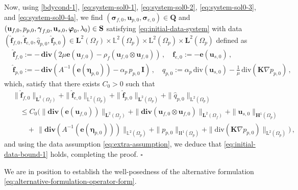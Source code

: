 \documentclass[11pt]{article}
\numberwithin{equation}{section}
\newcommand{\bgamma}{{\boldsymbol\gamma}}
\newcommand{\bbeta}{{\boldsymbol\eta}}
\newcommand{\bsi}{{\boldsymbol\sigma}}
\newcommand{\bvarphi}{{\boldsymbol\varphi}}
\newcommand{\f}{\mathbf{f}}
\newcommand{\bu}{\mathbf{u}}
\newcommand{\be}{{\mathbf{e}}}
\newcommand{\0}{{\mathbf{0}}}
\def\bK{\mathbf{K}}
\def\bI{\mathbf{I}}
\def\bQ{\mathbf{Q}}
\def\bS{\mathbf{S}}
\newcommand{\bL}{\mathbf{L}}
\newcommand\bH{\mathbf{H}}
\newcommand\bbL{\mathbb{L}}
\def\H{\mathrm{H}}
\def\L{\mathrm{L}}
\def\bdiv{\mathbf{div}}
\def\div{\mathrm{div}}
\def\wh{\widehat}
\newenvironment{proof}{\noindent{\it Proof.}}{\hfill$\square$}
\numberwithin{equation}{section}
\begin{document}
\begin{proof}
Now, using \eqref{bdycond-1}, \eqref{eq:system-sol0-1}, \eqref{eq:system-sol0-2}, \eqref{eq:system-sol0-3}, and \eqref{eq:system-sol0-4a}, we find
$(\bsi_{f,0}, \bu_{p,0}, \bsi_{e,0})\in \bQ$ and  $(\bu_{f,0},p_{p,0},\bgamma_{f,0},\newline\bu_{s,0},\bvarphi_0,\lambda_0)\in \bS$ satisfying \eqref{eq:initial-data-system} with data $(\wh{\f}_{f,0},\wh{\f}_{e,0},\wh{q}_{p,0},\wh{\f}_{p,0})\in 
\bL^2(\Omega_f)\times\bbL^2(\Omega_p)\times \L^2(\Omega_p) \times \bL^2(\Omega_p)$ defined as
%
\begin{align*}
& \wh{\f}_{f,0} := -\,\bdiv(2\mu\be(\bu_{f,0}) - \rho_f(\bu_{f,0}\otimes\bu_{f,0})) \,,\quad 
{\f}_{e,0} := -\be(\bu_{s,0}) \,,\\[0.5ex]
& \wh{\f}_{p,0} := -\,\bdiv(A^{-1}(\be(\bbeta_{p,0})) - \alpha_p\,p_{p,0}\,\bI) \,,\quad 
\wh{q}_{p,0} := \alpha_p\,\div(\bu_{s,0}) - \frac{1}{\mu}\,\div(\bK\nabla p_{p,0}) \,,
\end{align*}
%
which, satisfy that there exists $C_0 > 0$ such that
\begin{align}
&\|\wh{\f}_{f,0}\|_{\bL^2(\Omega_f)} + \|\wh{\f}_{e,0}\|_{\bbL^2(\Omega_p)} +  \|\wh{\f}_{p,0}\|_{\bL^2(\Omega_p)} + \|\wh{q}_{p,0}\|_{\L^2(\Omega_p)} \nonumber\\ 
&\quad \leq C_0 \Big(\|\bdiv(\be(\bu_{f,0}))\|_{\bL^{2}(\Omega_f)} 
+ \|\bdiv(\bu_{f,0}\otimes \bu_{f,0})\|_{\bL^2(\Omega_f)}
+ \|\bu_{s,0}\|_{\bH^1(\Omega_p)} \nonumber\\ 
&\qquad +\, \|\bdiv(A^{-1}(\be(\bbeta_{p,0})))\|_{\bbL^2(\Omega_p)} 
+ \|p_{p,0}\|_{\H^1(\Omega_p)}+\|\div(\bK\nabla p_{p,0})\|_{\L^2(\Omega_p)}\Big)\,, \label{eq: initial data bound}
\end{align}
and using the data assumption \eqref{eq:extra-assumption}, we deduce that \eqref{eq:initial-data-bound-1} holds,
completing the proof.
\end{proof}

We are in position to establish the well-posedness of the alternative formulation \eqref{eq:alternative-formulation-operator-form}.
\end{document}
